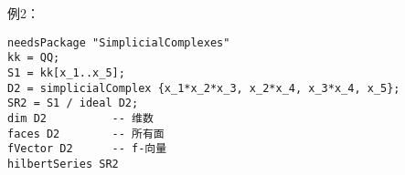\documentclass[12pt,a4paper]{ctexbook} %
\numberwithin{figure}{section}
\theoremstyle{problemstyle}
\numberwithin{equation}{section} %
\begin{document}
例2：
\begin{lstlisting}
needsPackage "SimplicialComplexes"
kk = QQ;
S1 = kk[x_1..x_5];
D2 = simplicialComplex {x_1*x_2*x_3, x_2*x_4, x_3*x_4, x_5};
SR2 = S1 / ideal D2;
dim D2          -- 维数
faces D2        -- 所有面
fVector D2      -- f-向量
hilbertSeries SR2

\end{lstlisting}





 
\end{document}
